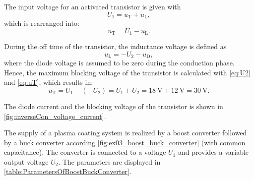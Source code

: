 \begin{solutionblock}
    The input voltage for an activated transistor is given with
    \begin{equation}
        U_1 = u_{\mathrm{T}} + u_{\mathrm{L}},
    \end{equation}
    which is rearranged into:
    \begin{equation}
        u_{\mathrm{T}} = U_1 - u_{\mathrm{L}}.
        \label{eq:uT}
    \end{equation}

    During the off time of the transistor, the inductance voltage is defined as
    \begin{equation}
        u_{\mathrm{L}} = -U_2 - u_{\mathrm{D}},
        \label{eq:U2}
    \end{equation}
    where the diode voltage is assumed to be zero during the conduction phase.
    Hence, the maximum blocking voltage of the transistor is calculated with \eqref{eq:U2} and \eqref{eq:uT}, which results in:
    \begin{equation}
        u_{\mathrm{T}} = U_1 - (-U_2)
        = U_1 + U_2 = \SI{18}{\volt} + \SI{12}{\volt} = \SI{30}{\volt}.
    \end{equation}

    The diode current and the blocking voltage of the transistor is shown in \autoref{fig:inverseCon_voltage_current}.
    
\end{solutionblock}





The supply of a plasma coating system is realized by a boost converter followed by a buck converter according \autoref{fig:ex03_boost_buck_converter} (with common capacitance).
The converter is connected to a voltage $U_\mathrm{1}$ and provides a variable output voltage $U_\mathrm{2}$. The parameters are displayed in \autoref{table:ParametersOfBoostBuckConverter}.
\vspace{2em}\par

\par

\par


